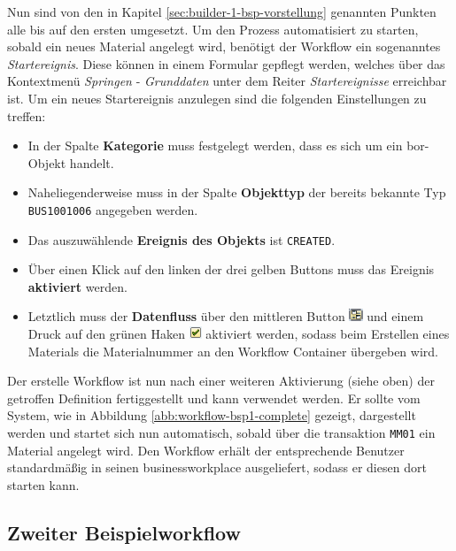 Nun sind von den in Kapitel \ref{sec:builder-1-bsp-vorstellung} genannten Punkten alle bis auf den ersten umgesetzt. Um den Prozess automatisiert zu starten, sobald ein neues Material angelegt wird, benötigt der Workflow ein sogenanntes \textit{Startereignis}. Diese können in einem Formular gepflegt werden, welches über das Kontextmenü \textit{Springen} - \textit{Grunddaten} unter dem Reiter \textit{Startereignisse} erreichbar ist. Um ein neues Startereignis anzulegen sind die folgenden Einstellungen zu treffen:

\begin{itemize}
	\item In der Spalte \textbf{Kategorie} muss festgelegt werden, dass es sich um ein \gls{bor}-Objekt handelt. 
	\item Naheliegenderweise muss in der Spalte \textbf{Objekttyp} der bereits bekannte Typ \texttt{BUS1001006} angegeben werden.
	\item Das auszuwählende \textbf{Ereignis des Objekts} ist \texttt{CREATED}.
	\item Über einen Klick auf den linken der drei gelben Buttons muss das Ereignis \textbf{aktiviert} werden.
	\item Letztlich muss der \textbf{Datenfluss} über den mittleren Button \includegraphics[height=1em]{grafiken/wf-builder_bsp1_btn-datenfluss.png} und einem Druck auf den grünen Haken \includegraphics[height=1em]{grafiken/btn_sap_apply.png} aktiviert werden, sodass beim Erstellen eines Materials die Materialnummer an den Workflow Container übergeben wird.
\end{itemize}

Der erstelle Workflow ist nun nach einer weiteren Aktivierung (siehe oben) der getroffen Definition fertiggestellt und kann verwendet werden. Er sollte vom System, wie in Abbildung \ref{abb:workflow-bsp1-complete} gezeigt, dargestellt werden und startet sich nun automatisch, sobald über die \gls{transaktion} \texttt{MM01} ein Material angelegt wird. Den Workflow erhält der entsprechende Benutzer standardmäßig in seinen \gls{businessworkplace} ausgeliefert, sodass er diesen dort starten kann.

\subsection{Zweiter Beispielworkflow}
\label{sec:builder-2-bsp}

